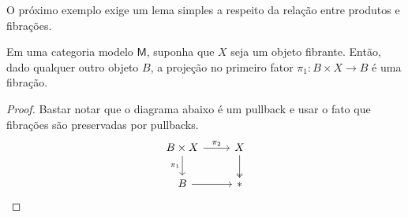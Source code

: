 O próximo exemplo exige um lema simples a respeito da relação entre produtos e fibrações.

\begin{lema}\label{lema:produto_com_fibrante_induz_fibracao}
  Em uma categoria modelo $\mathsf{M}$, suponha que $X$ seja um objeto fibrante.
  Então, dado qualquer outro objeto $B$, a projeção no primeiro fator $\pi_{1}: B \times X \to B$ é uma fibração.
\end{lema}

\begin{proof}
  Bastar notar que o diagrama abaixo é um pullback e usar o fato que fibrações são preservadas por pullbacks.
  \begin{displaymath}
    \begin{tikzcd}
      B \times X
      \arrow[d, "\pi_{1}" swap]
      \arrow[r, "\pi_{2}"]
      & X
      \arrow[d, two heads]
      \\ B
      \arrow[r]
      & *
    \end{tikzcd} \qedhere
  \end{displaymath}
\end{proof}

